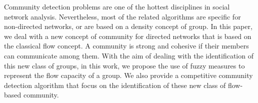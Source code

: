 

Community detection problems are one of the hottest disciplines in social network analysis. Nevertheless, most of the related algorithms are specific for non-directed networks, or are based on a density concept of group. In this paper, we deal with a new concept of community for directed networks that is based on the classical flow concept.  A community is strong and cohesive if their members can communicate among them. With the aim of dealing with the identification of this new class of groups, in this work, we propose the use of fuzzy measures to represent the flow capacity of a group. We also provide a competitive community detection algorithm that focus on the identification of these new class of flow-based community. 
\color{black}


